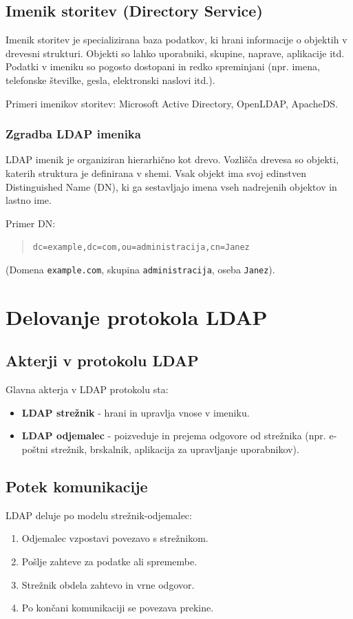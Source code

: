 \documentclass[a4paper,12pt]{article}
\begin{document}
\subsection{Imenik storitev (Directory Service)}
Imenik storitev je specializirana baza podatkov, ki hrani informacije o objektih v drevesni strukturi. Objekti so lahko uporabniki, skupine, naprave, aplikacije itd. Podatki v imeniku so pogosto dostopani in redko spreminjani (npr. imena, telefonske številke, gesla, elektronski naslovi itd.).

Primeri imenikov storitev: Microsoft Active Directory, OpenLDAP, ApacheDS.

\subsubsection{Zgradba LDAP imenika}
LDAP imenik je organiziran hierarhično kot drevo. Vozlišča drevesa so objekti, katerih struktura je definirana v shemi. Vsak objekt ima svoj edinstven Distinguished Name (DN), ki ga sestavljajo imena vseh nadrejenih objektov in lastno ime.

Primer DN:
\begin{quote}
    \texttt{dc=example,dc=com,ou=administracija,cn=Janez}
\end{quote}
(Domena \texttt{example.com}, skupina \texttt{administracija}, oseba \texttt{Janez}).

\section{Delovanje protokola LDAP}

\subsection{Akterji v protokolu LDAP}
Glavna akterja v LDAP protokolu sta:
\begin{itemize}
    \item \textbf{LDAP strežnik} - hrani in upravlja vnose v imeniku.
    \item \textbf{LDAP odjemalec} - poizveduje in prejema odgovore od strežnika (npr. e-poštni strežnik, brskalnik, aplikacija za upravljanje uporabnikov).
\end{itemize}

\subsection{Potek komunikacije}
LDAP deluje po modelu strežnik-odjemalec:
\begin{enumerate}
    \item Odjemalec vzpostavi povezavo s strežnikom.
    \item Pošlje zahteve za podatke ali spremembe.
    \item Strežnik obdela zahtevo in vrne odgovor.
    \item Po končani komunikaciji se povezava prekine.
\end{enumerate}
\end{document}
